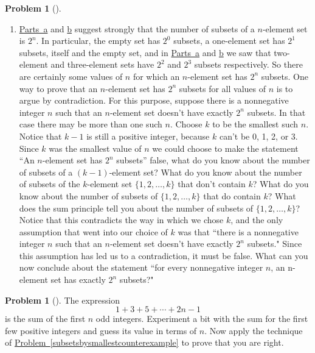 \documentclass[10pt,]{book}
\theoremstyle{plain}
\theoremstyle{definition}
\newtheorem{activity}[project]{Problem}
\theoremstyle{definition}
\numberwithin{equation}{chapter}
\begin{document}
\begin{activity}[]
\begin{enumerate}[font=\bfseries,label=(\alph*),ref=\alph*]
\item\label{task-258} \marginsymbol[-2.5em]{} \hyperref[subsetsbysmallestcounterexample1]{Parts~a} and \hyperref[subsetsbysmallestcounterexample2]{b} suggest strongly that the number of subsets of a \(n\)-element set is \(2^n\). In particular, the empty set has \(2^0\) subsets, a one-element set has \(2^1\) subsets, itself and the empty set, and in \hyperref[subsetsbysmallestcounterexample1]{Parts~a} and \hyperref[subsetsbysmallestcounterexample2]{b} we saw that two-element and three-element sets have \(2^2\) and \(2^3\) subsets respectively. So there are certainly some values of \(n\) for which an \(n\)-element set has \(2^n\) subsets. One way to prove that an \(n\)-element set has \(2^n\) subsets for all values of \(n\) is to argue by contradiction. For this purpose, suppose there is a nonnegative integer \(n\) such that an \(n\)-element set doesn't have exactly \(2^n\) subsets. In that case there may be more than one such \(n\). Choose \(k\) to be the smallest such \(n\). Notice that \(k -1\) is still a positive integer, because \(k\) can't be 0, 1, 2, or 3. Since \(k\) was the smallest value of \(n\) we could choose to make the statement ``An \(n\)-element set has \(2^n\) subsets'' false, what do you know about the number of subsets of a \((k - 1)\)-element set? What do you know about the number of subsets of the \(k\)-element set \(\{1, 2, \ldots, k \}\) that don't contain \(k\)? What do you know about the number of subsets of \(\{1,
2, \ldots,  k \}\) that do contain \(k\)? What does the sum principle tell you about the number of subsets of \(\{1, 2, \ldots, k \}\)? Notice that this contradicts the way in which we chose \(k\), and the only assumption that went into our choice of \(k\) was that ``there is a nonnegative integer \(n\) such that an \(n\)-element set doesn't have exactly \(2^n\) subsets." Since this assumption has led us to a contradiction, it must be false. What can you now conclude about the statement ``for every nonnegative integer \(n\), an n-element set has exactly \(2^n\) subsets?"%
\end{enumerate}
\end{activity}
\begin{activity}[]\marginsymbol[-1em]{} \label{sumodd}
The expression%
\begin{equation*}
1+3+5+\cdots+2n-1
\end{equation*}
is the sum of the first \(n\) odd integers. Experiment a bit with the sum for the first few positive integers and guess its value in terms of \(n\). Now apply the technique of \hyperref[subsetsbysmallestcounterexample]{Problem~\ref{subsetsbysmallestcounterexample}} to prove that you are right.%
\end{activity}
\end{document}
